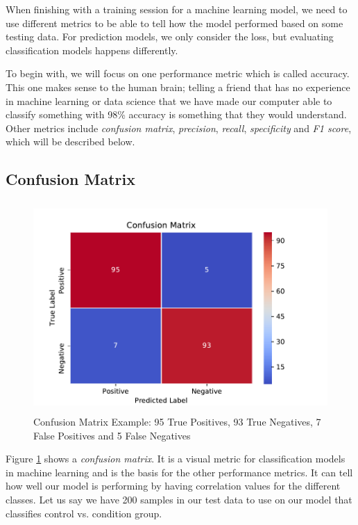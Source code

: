 When finishing with a training session for a machine learning model, we need to use different metrics to be able to tell how the model performed based on some testing data. For prediction models, we only consider the loss, but evaluating classification models happens differently. 

To begin with, we will focus on one performance metric which is called accuracy. This one makes sense to the human brain; telling a friend that has no experience in machine learning or data science that we have made our computer able to classify something with 98\% accuracy is something that they would understand. Other metrics include \textit{confusion matrix}, \textit{precision}, \textit{recall}, \textit{specificity} and \textit{F1 score}, which will be described below.

\subsection{Confusion Matrix}

\begin{figure}[h]
  \begin{center}
    \includegraphics[height=8cm]{img/conf_matrix.pdf}
    \caption{Confusion Matrix Example: 95 True Positives, 93 True Negatives, 7 False Positives and 5 False Negatives}
    \label{figure:confusion_matrix_bipolar}
  \end{center}
\end{figure}

Figure \ref{figure:confusion_matrix_bipolar} shows a \textit{confusion matrix}. It is a visual metric for classification models in machine learning and is the basis for the other performance metrics. It can tell how well our model is performing by having correlation values for the different classes. Let us say we have 200 samples in our test data to use on our model that classifies control vs. condition group. 

